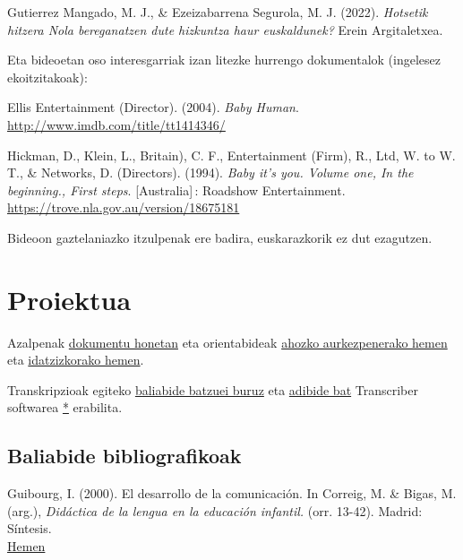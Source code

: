 \documentclass[
]{book}
\begin{document}
Gutierrez Mangado, M. J., \& Ezeizabarrena Segurola, M. J. (2022). \emph{Hotsetik hitzera Nola bereganatzen dute hizkuntza haur euskaldunek?} Erein Argitaletxea.

Eta bideoetan oso interesgarriak izan litezke hurrengo dokumentalok (ingelesez ekoitzitakoak):

Ellis Entertainment (Director). (2004). \emph{Baby Human}. \url{http://www.imdb.com/title/tt1414346/}

Hickman, D., Klein, L., Britain), C. F., Entertainment (Firm), R., Ltd, W. to W. T., \& Networks, D. (Directors). (1994). \emph{Baby it's you. Volume one, In the beginning., First steps}. {[}Australia{]}\,: Roadshow Entertainment. \url{https://trove.nla.gov.au/version/18675181}

Bideoon gaztelaniazko itzulpenak ere badira, euskarazkorik ez dut ezagutzen.

\hypertarget{proiektua}{%
\chapter*{Proiektua}\label{proiektua}}

Azalpenak \href{../beste/Proiektua/Deskribapena-dokumentua.pdf}{dokumentu honetan} eta orientabideak \href{../beste/Proiektua/Proiektua-Orientabideak_ahozko_aurkezpenerako.pdf}{ahozko aurkezpenerako hemen} eta \href{../beste/Proiektua/Proiektua-Orientabideak_idatzizko_lanerako.pdf}{idatzizkorako hemen}.

Transkripzioak egiteko \href{http://bosgarrena.blogspot.com/2019/10/transkripzioak-egiteko-erreminta-libre.html}{baliabide batzuei buruz} eta \href{../beste/Proiektua/senior_.html}{adibide bat} Transcriber softwarea \href{http://trans.sourceforge.net/en/presentation.php}{*} erabilita.

\hypertarget{baliabide-bibliografikoak}{%
\section*{Baliabide bibliografikoak}\label{baliabide-bibliografikoak}}

Guibourg, I. (2000). El desarrollo de la comunicación. In Correig, M. \& Bigas, M. (arg.), \emph{Didáctica de la lengua en la educación infantil.} (orr. 13-42). Madrid: Síntesis.\\
\href{../beste/Proiektua/GUIBOURG_El_desarrollo_de_la_comunicacion.pdf}{Hemen}
\end{document}
